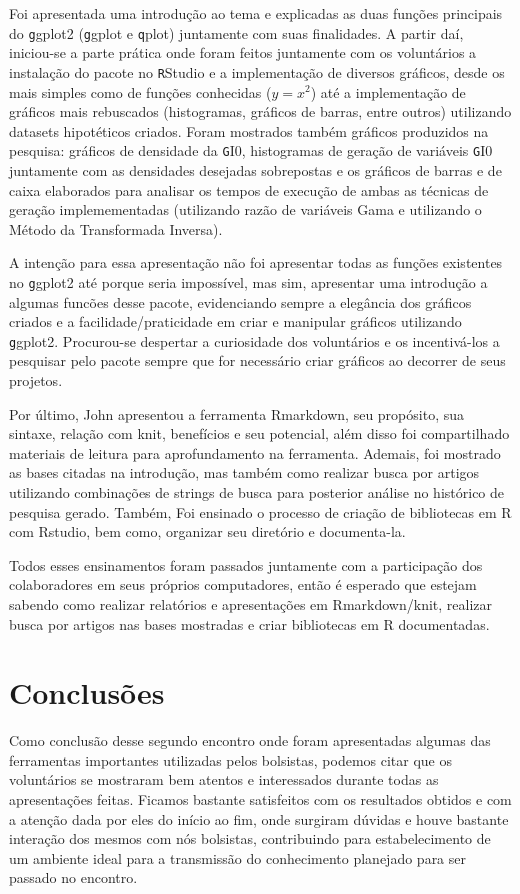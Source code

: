 \documentclass[12pt,letterpaper]{article}
\begin{document}
Foi apresentada uma introdução ao tema e explicadas as duas funções principais do \texttt ggplot2 (\texttt ggplot e \texttt qplot) juntamente com suas finalidades. A partir daí, iniciou-se a parte prática onde foram feitos juntamente com os voluntários a instalação do pacote no \texttt RStudio e a implementação de diversos gráficos, desde os mais simples como de funções conhecidas ($y = x^{2}$) até a implementação de gráficos mais rebuscados (histogramas, gráficos de barras, entre outros) utilizando datasets hipotéticos criados. Foram mostrados também gráficos produzidos na pesquisa: gráficos de densidade da \texttt GI0, histogramas de geração de variáveis \texttt GI0 juntamente com as densidades desejadas sobrepostas e os gráficos de barras e de caixa elaborados para analisar os tempos de execução de ambas as técnicas de geração implemementadas (utilizando razão de variáveis Gama e utilizando o Método da Transformada Inversa).

A intenção para essa apresentação não foi apresentar todas as funções existentes no \texttt ggplot2 até porque seria impossível, mas sim, apresentar uma introdução a algumas funcões desse pacote, evidenciando sempre a elegância dos gráficos criados e a facilidade/praticidade em criar e manipular gráficos utilizando \texttt ggplot2. Procurou-se despertar a curiosidade dos voluntários e os incentivá-los a pesquisar pelo pacote sempre que for necessário criar gráficos ao decorrer de seus projetos.

Por último, John apresentou a ferramenta Rmarkdown, seu propósito, sua sintaxe, relação com knit, benefícios e seu potencial, além disso foi compartilhado materiais de leitura para aprofundamento na ferramenta. Ademais, foi mostrado as bases citadas na introdução, mas também como realizar busca por artigos utilizando combinações de strings de busca para posterior análise no histórico de pesquisa gerado. Também, Foi ensinado o processo de criação de bibliotecas em R com Rstudio, bem como, organizar seu diretório e documenta-la.

Todos esses ensinamentos foram passados juntamente com a participação dos colaboradores em seus próprios computadores, então é esperado que estejam sabendo como realizar relatórios e apresentações em Rmarkdown/knit, realizar busca por artigos nas bases mostradas e criar bibliotecas em R documentadas.

\section{Conclusões}

Como conclusão desse segundo encontro onde foram apresentadas algumas das ferramentas importantes utilizadas pelos bolsistas, podemos citar que os voluntários se mostraram bem atentos e interessados durante todas as apresentações feitas. Ficamos bastante satisfeitos com os resultados obtidos e com a atenção dada por eles do início ao fim, onde surgiram dúvidas e houve bastante interação dos mesmos com nós bolsistas, contribuindo para estabelecimento de um ambiente ideal para a transmissão do conhecimento planejado para ser passado no encontro.



\end{document}
